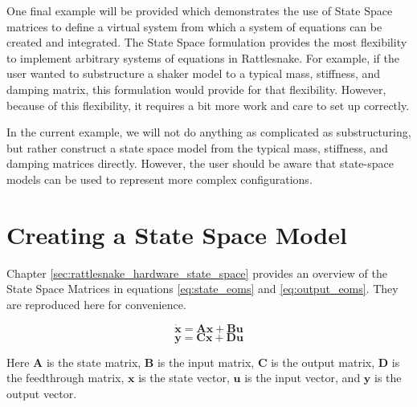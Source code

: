 \documentclass[pdf,12pt,report]{SANDreport}
\begin{document}
{{{{{{{    One final example will be provided which demonstrates the use of State Space matrices to define a virtual system from which a system of equations can be created and integrated.  The State Space formulation provides the most flexibility to implement arbitrary systems of equations in Rattlesnake.  For example, if the user wanted to substructure a shaker model to a typical mass, stiffness, and damping matrix, this formulation would provide for that flexibility.  However, because of this flexibility, it requires a bit more work and care to set up correctly.
    
    In the current example, we will not do anything as complicated as substructuring, but rather construct a state space model from the typical mass, stiffness, and damping matrices directly.  However, the user should be aware that state-space models can be used to represent more complex configurations.
    
    \section{Creating a State Space Model}
    
    Chapter \ref{sec:rattlesnake_hardware_state_space} provides an overview of the State Space Matrices in equations \eqref{eq:state_eoms} and \eqref{eq:output_eoms}.  They are reproduced here for convenience.
    
    \begin{equation}
        \dot{\mathbf{x}} = \mathbf{A}\mathbf{x} + \mathbf{B}\mathbf{u}
    \end{equation}
    \begin{equation}
        \mathbf{y} = \mathbf{C}\mathbf{x} + \mathbf{D}\mathbf{u}
    \end{equation}
    
    Here $\mathbf{A}$ is the state matrix, $\mathbf{B}$ is the input matrix, $\mathbf{C}$ is the output matrix, $\mathbf{D}$ is the feedthrough matrix, $\mathbf{x}$ is the state vector, $\mathbf{u}$ is the input vector, and $\mathbf{y}$ is the output vector. 
    
}}}}}}}
\end{document}
